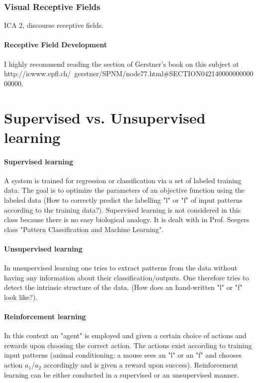 \documentclass[11pt]{article}
\begin{document}
\subsubsection{Visual Receptive Fields}
ICA 2, discourse receptive fields. 

\paragraph{Receptive Field Development} I highly recommend reading the section of Gerstner's book on this subject at http://icwww.epfl.ch/~gerstner/SPNM/node77.html\#SECTION04214000000000000000.


\section{Supervised vs. Unsupervised learning}
\paragraph{Supervised learning} A system is trained for regression or classification via a set of labeled training data. The goal is to optimize the parameters of an objective function using the labeled data (How to correctly predict the labelling "l" or "f" of input patterns according to the training data?). Supervised learning is not considered in this class because there is no easy biological analogy. It is dealt with in Prof. Seegers class "Pattern Classification and Machine Learning".
\paragraph{Unsupervised learning} In unsupervised learning one tries to extract patterns from the data without having any information about their classification/outputs. One therefore tries to detect the intrinsic structure of the data. (How does an hand-written "l" or "f" look like?). 
\paragraph{Reinforcement learning}
In this context an "agent" is employed and given a certain choice of actions and rewards upon choosing the correct action. The actions exist according to training input patterns (animal conditioning: a mouse sees an "l" or an "f" and chooses action $a_1$/$a_2$ accordingly and is given a reward upon success).
Reinforcement learning can be either conducted in a supervised or an unsupervised manner.
\end{document}
